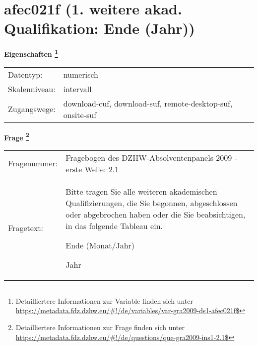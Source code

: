 
    \setcounter{footnote}{0}

    \vspace*{-1.8cm}
	\section{afec021f (1. weitere akad. Qualifikation: Ende (Jahr))}
	\label{section:afec021f}



    \vspace*{0.5cm}
    \noindent\textbf{Eigenschaften
	\footnote{Detailliertere Informationen zur Variable finden sich unter
		\url{https://metadata.fdz.dzhw.eu/\#!/de/variables/var-gra2009-ds1-afec021f$}}}\\
	\begin{tabularx}{\hsize}{@{}lX}
	Datentyp: & numerisch \\
	Skalenniveau: & intervall \\
	Zugangswege: &
	  download-cuf, 
	  download-suf, 
	  remote-desktop-suf, 
	  onsite-suf
 \\
    \end{tabularx}



				\vspace*{0.5cm}
                \noindent\textbf{Frage
	                \footnote{Detailliertere Informationen zur Frage finden sich unter
		              \url{https://metadata.fdz.dzhw.eu/\#!/de/questions/que-gra2009-ins1-2.1$}}}\\
				\begin{tabularx}{\hsize}{@{}lX}
					Fragenummer: &
					  Fragebogen des DZHW-Absolventenpanels 2009 - erste Welle:
					  2.1
 \\
					Fragetext: & Bitte tragen Sie alle weiteren akademischen Qualifizierungen, die Sie begonnen, abgeschlossen oder abgebrochen haben oder die Sie beabsichtigen, in das folgende Tableau ein.\par  Ende (Monat/Jahr)\par  Jahr \\
				\end{tabularx}





